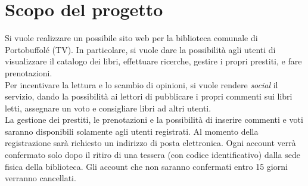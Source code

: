 \section{Scopo del progetto}
Si vuole realizzare un possibile sito web per la biblioteca comunale di Portobuffolé (TV). In particolare, si vuole dare la possibilità agli utenti di visualizzare il catalogo dei libri, effettuare ricerche, gestire i propri prestiti, e fare prenotazioni.\\
Per incentivare la lettura e lo scambio di opinioni, si vuole rendere \textit{social} il servizio, dando la possibilità ai lettori di pubblicare i propri commenti sui libri letti, assegnare un voto e consigliare libri ad altri utenti.\\
La gestione dei prestiti, le prenotazioni e la possibilità di inserire commenti e voti saranno disponibili solamente agli utenti registrati. Al momento della registrazione sarà richiesto un indirizzo di posta elettronica. Ogni account verrà confermato solo dopo il ritiro di una tessera (con codice identificativo) dalla sede fisica della biblioteca. Gli account che non saranno confermati entro 15 giorni verranno cancellati. 

\newpage